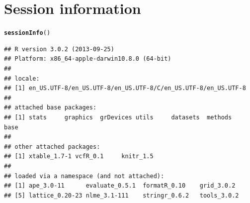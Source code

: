 \documentclass{article}\usepackage[]{graphicx}\usepackage[]{color}
\makeatletter
\newcommand{\hlstd}[1]{\textcolor[rgb]{0.345,0.345,0.345}{#1}}%
\newcommand{\hlkwd}[1]{\textcolor[rgb]{0.737,0.353,0.396}{\textbf{#1}}}%
\newenvironment{kframe}{%
 \def\at@end@of@kframe{}%
 \ifinner\ifhmode%
  \def\at@end@of@kframe{\end{minipage}}%
  \begin{minipage}{\columnwidth}%
 \fi\fi%
 \def\FrameCommand##1{\hskip\@totalleftmargin \hskip-\fboxsep
 \colorbox{shadecolor}{##1}\hskip-\fboxsep
     \hskip-\linewidth \hskip-\@totalleftmargin \hskip\columnwidth}%
 \MakeFramed {\advance\hsize-\width
   \@totalleftmargin\z@ \linewidth\hsize
   \@setminipage}}%
 {\par\unskip\endMakeFramed%
 \at@end@of@kframe}
\newenvironment{knitrout}{}{} %
\makeatother
\begin{document}
\newpage






\vspace{24pt}


\section{Session information}

\begin{knitrout}
\color{fgcolor}\begin{kframe}
\begin{alltt}
\hlkwd{sessionInfo}\hlstd{()}
\end{alltt}
\begin{verbatim}
## R version 3.0.2 (2013-09-25)
## Platform: x86_64-apple-darwin10.8.0 (64-bit)
## 
## locale:
## [1] en_US.UTF-8/en_US.UTF-8/en_US.UTF-8/C/en_US.UTF-8/en_US.UTF-8
## 
## attached base packages:
## [1] stats     graphics  grDevices utils     datasets  methods   base     
## 
## other attached packages:
## [1] xtable_1.7-1 vcfR_0.1     knitr_1.5   
## 
## loaded via a namespace (and not attached):
## [1] ape_3.0-11      evaluate_0.5.1  formatR_0.10    grid_3.0.2     
## [5] lattice_0.20-23 nlme_3.1-111    stringr_0.6.2   tools_3.0.2
\end{verbatim}
\end{kframe}
\end{knitrout}






\end{document}
